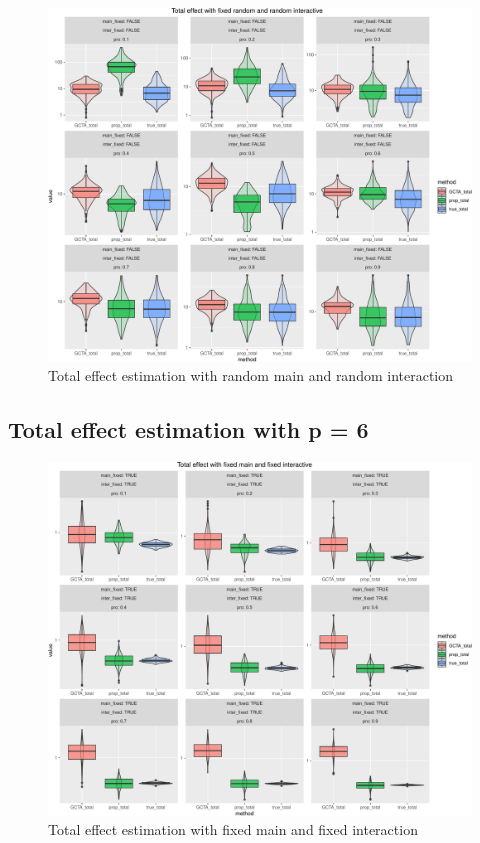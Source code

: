 \documentclass[]{article}
\begin{document}
\begin{figure}
\centering
\includegraphics{Simulation_report_files/figure-latex/Total effect random random-1.pdf}
\caption{Total effect estimation with random main and random
interaction}
\end{figure}

\newpage

\subsection{Total effect estimation with p =
6}\label{total-effect-estimation-with-p-6}

\begin{figure}
\centering
\includegraphics{Simulation_report_files/figure-latex/Total effect fixed fixed 6-1.pdf}
\caption{Total effect estimation with fixed main and fixed interaction}
\end{figure}
\end{document}
